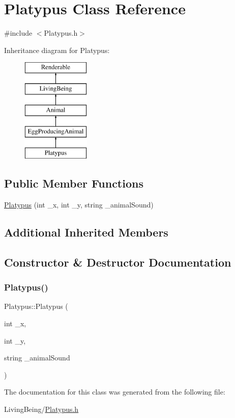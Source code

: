 \hypertarget{classPlatypus}{}\section{Platypus Class Reference}
\label{classPlatypus}


{\ttfamily \#include $<$Platypus.\+h$>$}

Inheritance diagram for Platypus\+:\begin{figure}[H]
\begin{center}
\leavevmode
\includegraphics[height=5.000000cm]{classPlatypus}
\end{center}
\end{figure}
\subsection*{Public Member Functions}
\begin{DoxyCompactItemize}
\item 
\mbox{\hyperlink{classPlatypus_ab0adbf27ff4ca484505d4db6ce196887}{Platypus}} (int \+\_\+x, int \+\_\+y, string \+\_\+animal\+Sound)
\end{DoxyCompactItemize}
\subsection*{Additional Inherited Members}


\subsection{Constructor \& Destructor Documentation}
\mbox{\label{classPlatypus_ab0adbf27ff4ca484505d4db6ce196887}} 
\subsubsection{\texorpdfstring{Platypus()}{Platypus()}}
{\footnotesize\ttfamily Platypus\+::\+Platypus (\begin{DoxyParamCaption}\item[{int}]{\+\_\+x,  }\item[{int}]{\+\_\+y,  }\item[{string}]{\+\_\+animal\+Sound }\end{DoxyParamCaption})}



The documentation for this class was generated from the following file\+:\begin{DoxyCompactItemize}
\item 
Living\+Being/\mbox{\hyperlink{Platypus_8h}{Platypus.\+h}}\end{DoxyCompactItemize}
